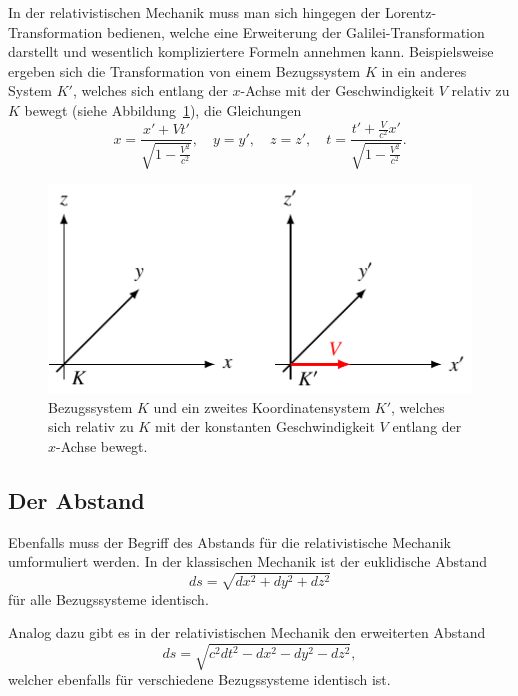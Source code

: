 In der relativistischen Mechanik muss man sich hingegen der Lorentz-Transformation bedienen,
welche eine Erweiterung der Galilei-Transformation darstellt
und wesentlich kompliziertere Formeln annehmen kann.
Beispielsweise ergeben sich die Transformation von einem
Bezugssystem \(K\) in ein anderes System \(K'\),
welches sich entlang der \(x\)-Achse mit der Geschwindigkeit \(V\)
relativ zu \(K\) bewegt (siehe Abbildung~\ref{relativ:fig:lorentz-trafo-koords}),
die Gleichungen
\begin{equation}
    x = \frac{x' + V t'}{\sqrt{1 - \frac{V^2}{c^2}}}, \quad
    y = y', \quad
    z = z', \quad
    t = \frac{t' + \frac{V}{c^2}x'}{\sqrt{1-\frac{V^2}{c^2}}}.
    \label{relativ:eqn:lorentz-trafo-beisp}
\end{equation}
\begin{figure}
    \centering
    \includegraphics{papers/relativ/tikz/lorentz-trafo-koord.pdf}
    \caption{Bezugssystem \(K\) und ein zweites Koordinatensystem \(K'\),
    welches sich relativ zu \(K\) mit der konstanten Geschwindigkeit \(V\)
    entlang der \(x\)-Achse bewegt.
    \label{relativ:fig:lorentz-trafo-koords}}
\end{figure}

\subsection{Der Abstand 
\label{relativ:section:abstand}}

Ebenfalls muss der Begriff des Abstands für die relativistische Mechanik umformuliert werden.
In der klassischen Mechanik ist der euklidische Abstand
\begin{equation}
    ds=\sqrt{dx^2 + dy^2 + dz^2}
    \label{relativ:eqn:abstand-klass}
\end{equation}
für alle Bezugssysteme identisch.

Analog dazu gibt es in der relativistischen Mechanik den erweiterten Abstand
\begin{equation}
    ds = \sqrt{c^2dt^2 - dx^2 - dy^2 - dz^2},
    \label{relativ:eqn:abstand-relativ}
\end{equation}
welcher ebenfalls für verschiedene Bezugssysteme identisch ist.


